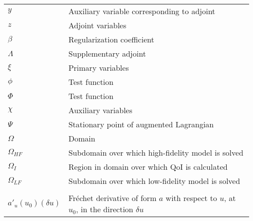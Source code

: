 \begin{longtable}{ p{}  p{} }
$y$							&	 	Auxiliary variable corresponding to adjoint \\
$z$	  					&	  Adjoint variables \\
$\beta$					&		Regularization coefficient \\
$\Lambda$				&		Supplementary adjoint \\
$\xi$						&		Primary variables \\
$\phi$					&		Test function \\
$\Phi$					&		Test function \\
$\chi$					&		Auxiliary variables \\
$\Psi$					&		Stationary point of augmented Lagrangian \\
$\Omega$				&		Domain \\
$\Omega_{HF}$		&		Subdomain over which high-fidelity model is solved \\
$\Omega_I$			&		Region in domain over which QoI is calculated \\
$\Omega_{LF}$		&		Subdomain over which low-fidelity model is solved \\
 & \\
$a'_u(u_0)(\delta u)$	& Fr\'{e}chet derivative of form $a$ with respect to $u$, at $u_0$, in the direction $\delta u$
\end{longtable}

